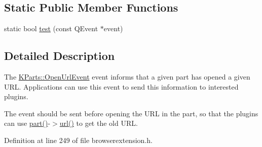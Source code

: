 \subsection*{\-Static \-Public \-Member \-Functions}
\begin{DoxyCompactItemize}
\item 
static bool \hyperlink{classKParts_1_1OpenUrlEvent_aa2c34fa11ddbcbf9828661fe681bcb62}{test} (const \-Q\-Event $\ast$event)
\end{DoxyCompactItemize}


\subsection{\-Detailed \-Description}
\-The \hyperlink{classKParts_1_1OpenUrlEvent}{\-K\-Parts\-::\-Open\-Url\-Event} event informs that a given part has opened a given \-U\-R\-L. \-Applications can use this event to send this information to interested plugins.

\-The event should be sent before opening the \-U\-R\-L in the part, so that the plugins can use \hyperlink{classKParts_1_1OpenUrlEvent_a2c23bcde7fee2966c25dbd7d961b151b}{part()}-\/$>$\hyperlink{classKParts_1_1OpenUrlEvent_a910c8c089b7c863e49cd83ddf4b8f003}{url()} to get the old \-U\-R\-L. 

\-Definition at line 249 of file browserextension.\-h.




